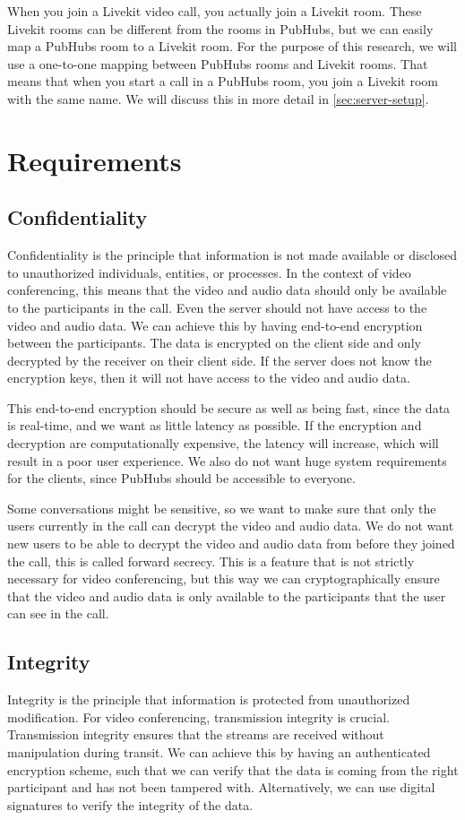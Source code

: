 \documentclass{report}
\begin{document}
When you join a Livekit video call, you actually join a Livekit room.
These Livekit rooms can be different from the rooms in PubHubs, but we can easily map a PubHubs room to a Livekit room.
For the purpose of this research, we will use a one-to-one mapping between PubHubs rooms and Livekit rooms. That means
that when you start a call in a PubHubs room, you join a Livekit room with the same name. We will discuss this in more
detail in \autoref{sec:server-setup}.

\chapter{Requirements}\label{chap:requirements}

\section{Confidentiality}
Confidentiality is the principle that information is not made available or disclosed to unauthorized individuals,
entities, or processes. In the context of video conferencing, this means that the video and audio data should only
be available to the participants in the call. Even the server should not have access to the video and audio data. We
can achieve this by having end-to-end encryption between the participants. The data is encrypted on the client side and
only decrypted by the receiver on their client side. If the server does not know the encryption keys, then it will
not have access to the video and audio data.

This end-to-end encryption should be secure as well as being fast, since the data is real-time, and we want as little
latency as possible. If the encryption and decryption are computationally expensive, the latency will increase,
which will result in a poor user experience. We also do not want huge system requirements for the clients, since
PubHubs should be accessible to everyone.

Some conversations might be sensitive, so we want to make sure that only the users currently in the call can
decrypt the video and audio data. We do not want new users to be able to decrypt the video and audio data from
before they joined the call, this is called forward secrecy. This is a feature that is not strictly necessary for
video conferencing, but this way we can cryptographically ensure that the video and audio data is only available to
the participants that the user can see in the call.

\section{Integrity}
Integrity is the principle that information is protected from unauthorized modification. For video conferencing, transmission integrity
is crucial. Transmission integrity ensures that the streams are received without manipulation during transit.
We can achieve this by having an authenticated encryption scheme, such that we can verify that the data is coming from
the right participant and has not been tampered with. Alternatively, we can use digital signatures to verify the
integrity of the data.
\end{document}
